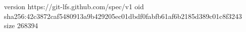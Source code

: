 version https://git-lfs.github.com/spec/v1
oid sha256:42c3872caf5480913a9b429205ec01dbdf0fabfb61af6b2185d389c01c8f3243
size 268394
